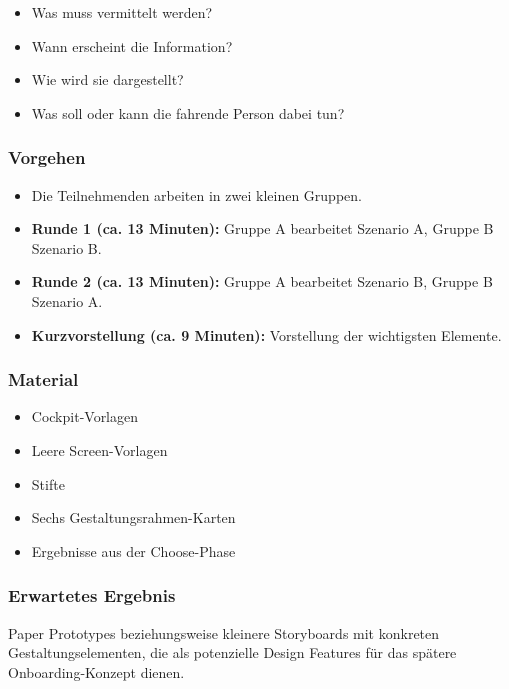 \begin{itemize}
    \item Was muss vermittelt werden?
    \item Wann erscheint die Information?
    \item Wie wird sie dargestellt?
    \item Was soll oder kann die fahrende Person dabei tun?
\end{itemize}

\subsubsection*{Vorgehen}

\begin{itemize}
    \item Die Teilnehmenden arbeiten in zwei kleinen Gruppen.

    \item \textbf{Runde 1 (ca. 13 Minuten):}
    Gruppe A bearbeitet Szenario A, Gruppe B Szenario B.

    \item \textbf{Runde 2 (ca. 13 Minuten):}
    Gruppe A bearbeitet Szenario B, Gruppe B Szenario A.

    \item \textbf{Kurzvorstellung (ca. 9 Minuten):}
    Vorstellung der wichtigsten Elemente.

\end{itemize}

\subsubsection*{Material}

\begin{itemize}
    \item Cockpit-Vorlagen
    \item Leere Screen-Vorlagen
    \item Stifte
    \item Sechs Gestaltungsrahmen-Karten
    \item Ergebnisse aus der Choose-Phase
\end{itemize}

\subsubsection*{Erwartetes Ergebnis}

Paper Prototypes beziehungsweise kleinere Storyboards mit konkreten
Gestaltungselementen, die als potenzielle Design Features für das spätere Onboarding-Konzept dienen.



